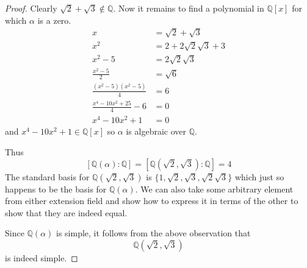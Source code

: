 \begin{proof}
    Clearly $\sqrt 2 + \sqrt 3 \not\in \mathbb Q$.
    Now it remains to find a polynomial in $\mathbb Q[x]$ for 
    which $\alpha$ is a zero.
    \begin{align*}
        x &= \sqrt 2 + \sqrt 3 \\ 
        x^2 &= 2 + 2\sqrt 2 \sqrt 3 + 3 \\ 
        x^2 - 5 &= 2 \sqrt 2 \sqrt 3 \\ 
        \frac{x^2 - 5}{2} &= \sqrt 6 \\ 
        \frac{(x^2 - 5)(x^2 - 5)}{4} &= 6 \\ 
        \frac{x^4 - 10x^2 + 25}{4} - 6 &= 0 \\ 
        x^4 - 10x^2 +1 &= 0
    \end{align*}
    and $x^4 - 10x^2 + 1 \in \mathbb Q[x]$ so 
    $\alpha$ is algebraic over $\mathbb Q$.

    Thus 
    \[
        [\mathbb Q(\alpha) : \mathbb Q] = [\mathbb Q(\sqrt 2, 
        \sqrt 3): \mathbb Q] = 4
    \]
    The standard basis for $\mathbb Q(\sqrt 2, \sqrt 3)$ is 
    $\{1,\sqrt 2, \sqrt 3, \sqrt 2 \sqrt 3\}$ which just so 
    happens to be the basis for $\mathbb Q(\alpha)$.
    We can also take some arbitrary element from either extension 
    field and show how to express it in terms of the other to show 
    that they are indeed equal.

    Since $\mathbb Q(\alpha)$ is simple, it follows from the above 
    observation that 
    \[
        \mathbb Q(\sqrt 2, \sqrt 3)
    \]
    is indeed simple.
\end{proof}

